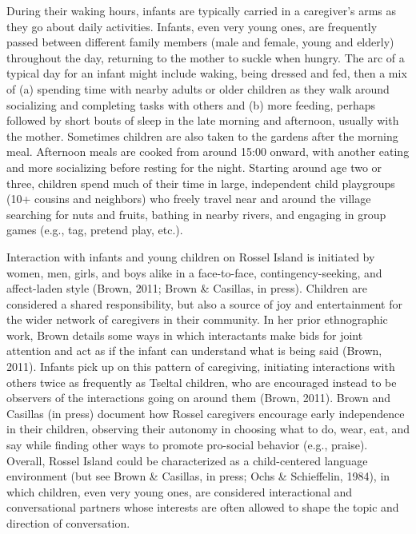 \documentclass[,man,floatsintext]{apa6}
\begin{document}
During their waking hours, infants are typically carried in a
caregiver's arms as they go about daily activities. Infants, even very
young ones, are frequently passed between different family members (male
and female, young and elderly) throughout the day, returning to the
mother to suckle when hungry. The arc of a typical day for an infant
might include waking, being dressed and fed, then a mix of (a) spending
time with nearby adults or older children as they walk around
socializing and completing tasks with others and (b) more feeding,
perhaps followed by short bouts of sleep in the late morning and
afternoon, usually with the mother. Sometimes children are also taken to
the gardens after the morning meal. Afternoon meals are cooked from
around 15:00 onward, with another eating and more socializing before
resting for the night. Starting around age two or three, children spend
much of their time in large, independent child playgroups (10+ cousins
and neighbors) who freely travel near and around the village searching
for nuts and fruits, bathing in nearby rivers, and engaging in group
games (e.g., tag, pretend play, etc.).

Interaction with infants and young children on Rossel Island is
initiated by women, men, girls, and boys alike in a face-to-face,
contingency-seeking, and affect-laden style (Brown, 2011; Brown \&
Casillas, in press). Children are considered a shared responsibility,
but also a source of joy and entertainment for the wider network of
caregivers in their community. In her prior ethnographic work, Brown
details some ways in which interactants make bids for joint attention
and act as if the infant can understand what is being said (Brown,
2011). Infants pick up on this pattern of caregiving, initiating
interactions with others twice as frequently as Tseltal children, who
are encouraged instead to be observers of the interactions going on
around them (Brown, 2011). Brown and Casillas (in press) document how
Rossel caregivers encourage early independence in their children,
observing their autonomy in choosing what to do, wear, eat, and say
while finding other ways to promote pro-social behavior (e.g., praise).
Overall, Rossel Island could be characterized as a child-centered
language environment (but see Brown \& Casillas, in press; Ochs \&
Schieffelin, 1984), in which children, even very young ones, are
considered interactional and conversational partners whose interests are
often allowed to shape the topic and direction of conversation.
\end{document}
